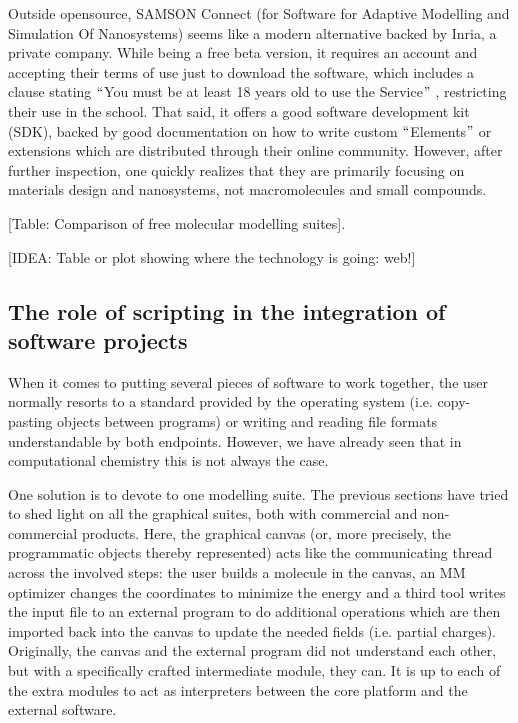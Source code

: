 Outside opensource, SAMSON Connect (for Software for Adaptive Modelling and Simulation Of Nanosystems) seems like a modern alternative backed by Inria, a private company. While being a free beta version, it requires an account and accepting their terms of use just to download the software, which includes a clause stating $``$You must be at least 18 years old to use the Service$"$ , restricting their use in the school. That said, it offers a good software development kit (SDK), backed by good documentation on how to write custom $``$Elements$"$  or extensions which are distributed through their online community. However, after further inspection, one quickly realizes that they are primarily focusing on materials design and nanosystems, not macromolecules and small compounds.

[Table: Comparison of free molecular modelling suites].

[IDEA: Table or plot showing where the technology is going: web!]

\subsection{The role of scripting in the integration of software projects}
When it comes to putting several pieces of software to work together, the user normally resorts to a standard provided by the operating system (i.e. copy-pasting objects between programs) or writing and reading file formats understandable by both endpoints. However, we have already seen that in computational chemistry this is not always the case.

One solution is to devote to one modelling suite. The previous sections have tried to shed light on all the graphical suites, both with commercial and non-commercial products. Here, the graphical canvas (or, more precisely, the programmatic objects thereby represented) acts like the communicating thread across the involved steps: the user builds a molecule in the canvas, an MM optimizer changes the coordinates to minimize the energy and a third tool writes the input file to an external program to do additional operations which are then imported back into the canvas to update the needed fields (i.e. partial charges). Originally, the canvas and the external program did not understand each other, but with a specifically crafted intermediate module, they can. It is up to each of the extra modules to act as interpreters between the core platform and the external software.

